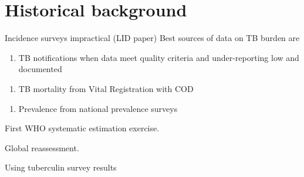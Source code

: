 \section{Historical background}

Incidence surveys impractical (LID paper)
Best sources of data on TB burden are 
\begin{enumerate}
\item TB notifications when data meet quality criteria and under-reporting low and documented
\end{enumerate}
\begin{enumerate}
\item TB mortality from Vital Registration with COD
\end{enumerate}
\begin{enumerate}
\item Prevalence from national prevalence surveys
\end{enumerate}

First WHO systematic estimation exercise\cite{1600578}.

Global reassessment\cite{10517722}.

Using tuberculin survey results\cite{Styblo1985}
  
  
  